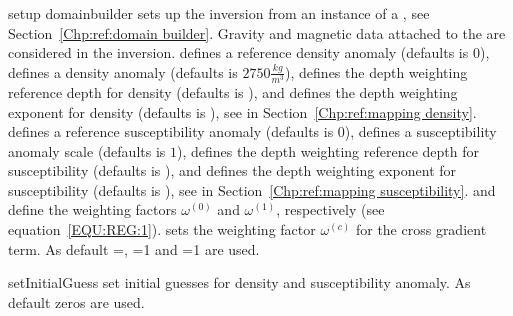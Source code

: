 \begin{methoddesc}[JointGravityMagneticInversion]{setup}{
domainbuilder
}
sets up the inversion from an instance  of a , see Section~\ref{Chp:ref:domain builder}.
Gravity and magnetic data attached to the  are considered in the inversion.
 defines a reference density anomaly (defaults is 0), 
 defines a density anomaly (defaults is $2750 \frac{kg}{m^3}$),
 defines the depth weighting reference depth for density (defaults is \None), and
 defines the depth weighting exponent for density (defaults is \None),
see  in Section~\ref{Chp:ref:mapping density}.
 defines a reference susceptibility anomaly (defaults is 0), 
 defines a susceptibility anomaly scale (defaults is $1$),
 defines the depth weighting reference depth for susceptibility (defaults is \None), and
 defines the depth weighting exponent for susceptibility (defaults is \None),
see  in Section~\ref{Chp:ref:mapping susceptibility}.
 and  define the weighting factors
$\omega^{(0)}$ and
$\omega^{(1)}$, respectively (see equation~\ref{EQU:REG:1}). 
 sets the weighting factor $\omega^{(c)}$ for the cross gradient term. 
As default =\None, =1 and =1 are used.
\end{methoddesc}

\begin{methoddesc}[JointGravityMagneticInversion]{setInitialGuess}{ }
set initial guesses for density and susceptibility anomaly. As default zeros are used.
\end{methoddesc}



